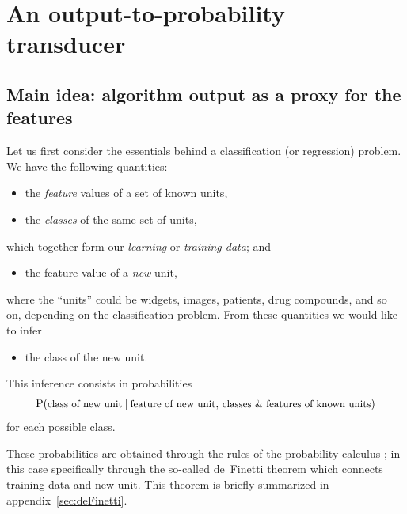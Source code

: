 \documentclass[\ifafour a4paper,12pt,\else a5paper,10pt,\fi%
onecolumn,oneside,article,%
british%
]{memoir}
\theoremstyle{remark}
\theoremstyle{innote}
\newcommand*{\amp}{\&}
\newcommand*{\pencil}{{\fontencoding{U}\fontfamily{fontawesometwo}\selectfont\symbol{210}}}
\newcommand{\mynotep}[1]{{\footnotesize\color{notecolour}\pencil\ #1}}
\renewcommand*{\P}{\mathrm{P}}%
\renewcommand*{\|}[1][]{\nonscript\:#1\vert\nonscript\:\mathopen{}}
\newcommand*{\chap}{ch.}%
\newcommand*{\chaps}{chs}%
\newcommand*{\texts}[1]{\text{\small #1}}
\begin{document}
\section{An output-to-probability transducer}
\label{sec:transducer}




\subsection{Main idea: algorithm output as a proxy for the features}
\label{sec:essential_idea}

Let us first consider the essentials behind a classification (or regression) problem. We have the following quantities:
\begin{itemize}
\item the \emph{feature} values of a set of known units,
\item the \emph{classes} of the same set of units,
\end{itemize}
which together form our \emph{learning} or \emph{training data}; and
\begin{itemize}[resume]
\item the feature value of a \emph{new} unit,
\end{itemize}
where the \enquote{units} could be widgets, images, patients, drug compounds, and so on, depending on the classification problem. From these quantities we would like to infer
\begin{itemize}[resume]
\item  the class of the new unit.
\end{itemize}
This inference consists in probabilities
\begin{equation}
  \label{eq:prob_essential}
  \P(\texts{class of new unit} \| \texts{feature of new unit},\,
  \texts{classes \amp\ features of known units})
\end{equation}
for each possible class.

These probabilities are obtained through the rules of the probability calculus \autocites{jaynes1994_r2003}[\chaps~12--13]{russelletal1995_r2022}[\addcolon see further references in appendix~\ref{sec:maths_transducer}]{gregory2005,hailperin2011,jeffreys1939_r1983}; in this case specifically through the so-called de~Finetti theorem \autocites[\chap~4]{bernardoetal1994_r2000}{dawid2013} which connects training data and new unit. This theorem is briefly summarized in appendix~\ref{sec:deFinetti}.
\end{document}
